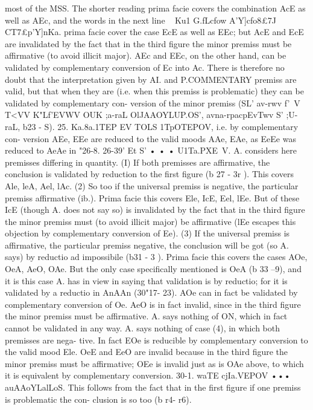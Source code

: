 {{{{{{{{{{{{most of the MSS. The shorter reading prima facie covers the
combination AcE as well as AEc, and the words in the next line
~ Ku1 G.fLcfow A'Y]cfo8£{7J CT7£p'Y]nKa. prima facie cover the case EcE as
well as EEc; but AcE and EcE are invalidated by the fact that
in the third figure the minor premiss must be affirmative (to
avoid illicit major). AEc and EEc, on the other hand, can be
validated by complementary conversion of Ec into Ac. There is
therefore no doubt that the interpretation given by AI. and P.COMMENTARY
premiss are valid, but that when they are (i.e. when this premiss
is problematic) they can be validated by complementary con-
version of the minor premiss (SL' av-rwv f'~V T<VV K"Lf'EVWV OUK ;a-raL
OlJAAOYLUP.OS', avna-rpacpEvTwv S' ;U-raL, b23 - S).
25. Ka.8a.1TEP EV TOLS 1TpOTEPOV, i.e. by complementary con-
version AEe, EEe are reduced to the valid moods AAe, EAe, as
EeEe was reduced to AeAe in "26-8.
26-39' Et S' • • • U1Ta.PXE~V.
A. considers here premisses
differing in quantity. (I) If both premisses are affirmative, the
conclusion is validated by reduction to the first figure (b 27 - 3r ).
This covers Ale, leA, Ael, lAc. (2) So too if the universal premiss
is negative, the particular premiss affirmative (ib.). Prima facie
this covers Ele, IcE, Eel, lEe. But of these IcE (though A. does
not say so) is invalidated by the fact that in the third figure the
minor premiss must (to avoid illicit major) be affirmative (lEe
escapes this objection by complementary conversion of Ee).
(3) If the universal premiss is affirmative, the particular premiss
negative, the conclusion will be got (so A. says) by reductio ad
impossibile (b31 - 3 ). Prima facie this covers the cases AOe, OeA,
AeO, OAe. But the only case specifically mentioned is OeA
(b 33 --9), and it is this case A. has in view in saying that validation
is by reductio; for it is validated by a reductio in AnAAn (30"17-
23). AOe can in fact be validated by complementary conversion
of Oe. AeO is in fact invalid, since in the third figure the minor
premiss must be affirmative. A. says nothing of ON, which in
fact cannot be validated in any way.
A. says nothing of case (4), in which both premisses are nega-
tive. In fact EOe is reducible by complementary conversion to
the valid mood Ele. OeE and EeO are invalid because in the third
figure the minor premiss must be affirmative; OEe is invalid just
as is OAe above, to which it is equivalent by complementary
conversion.
30-1. waTE cjIa.VEPOV ••• auAAoYLalLoS. This follows from the
fact that in the first figure if one premiss is problematic the con-
clusion is so too (b r4- r6).
}}}}}}}}}}}}}
